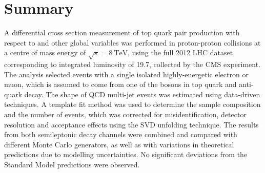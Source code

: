 \section{Summary}
\label{s_xsection:summary}
A differential cross section measurement of top quark pair production with respect to \MET and other global variables
was performed in proton-proton collisions at a centre of mass energy of $\sqrt{s} = \SI{8}{\TeV}$, using the full 2012
LHC dataset corresponding to integrated luminosity of \SI{19.7}{\fbinv}, collected by the CMS experiment. The analysis
selected events with a single isolated highly-energetic electron or muon, which is assumed to come from one of the \W
bosons in top quark and anti-quark decay. The shape of QCD multi-jet events was estimated using data-driven techniques.
A template fit method was used to determine the sample composition and the number of \ttbar events, which was corrected
for misidentification, detector resolution and acceptance effects using the SVD unfolding technique. The results from
both semileptonic decay channels were combined and compared with different Monte Carlo generators, as well as with
variations in theoretical predictions due to modelling uncertainties. No significant deviations from the Standard Model
predictions were observed.


